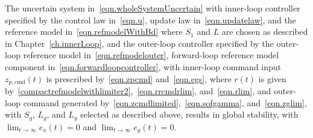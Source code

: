 \begin{thm-dan}\label{thm.outerlooplimiter}
  The uncertain system in\ \eqref{eqn.wholeSystemUncertain} with inner-loop controller specified by the control law in\ \eqref{eqn.u}, update law in\ \eqref{eqn.updatelaw}, and the reference model in\ \eqref{eqn.refmodelWithBd} where $S_{1}$ and $L$ are chosen as described in Chapter~\ref{ch.innerLoop}, and the outer-loop controller specified by the outer-loop reference model in\ \eqref{eqn.refmodelouter}, forward-loop reference model component in\ \eqref{eqn.forwardloopcontroller}, with inner-loop command input $z_{p,\text{cmd}}(t)$ is prescribed by\ \eqref{eqn.zpcmd} and\ \eqref{eqn.egs}, where $r(t)$ is given by\ \eqref{compactrefmodelwithlimiter2},\ \eqref{eqn.rrcmdrlim}, and\ \eqref{eqn.rlim}, and outer-loop command generated by\ \eqref{eqn.zcmdlimited},\ \eqref{eqn.sofgamma}, and\ \eqref{eqn.zglim}, with $S_{g}$, $L_{g}$, and $L_{y}$ selected as described above, results in global stability, with $\lim_{t\rightarrow\infty}e_{x}(t)=0$ and $\lim_{t\rightarrow\infty}e_{g}(t)=0$.
\end{thm-dan}

